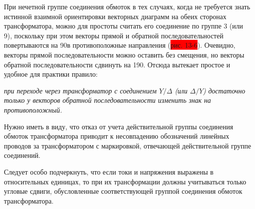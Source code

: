 При нечетной группе соединения обмоток в тех случаях, когда не требуется знать истинной взаимной ориентировки векторных диаграмм на обеих сторонах трансформатора, можно для простоты считать его соединение по группе 3 (или 9), поскольку при этом векторы прямой и обратной последовательностей повертываются на 90\textdegree в противоположные направления (\colorbox{red}{рис. 13-6}). Очевидно, векторы прямой последовательности можно оставить без смещения, но векторы обратной последовательности сдвинуть на 190\textdegree. Отсюда вытекает простое и удобное для практики правило:

\textit{при переходе через трансформатор с соединением $ Y/\Delta $ (или $ \Delta/Y $) достаточно только у векторов обратной последовательности изменить знак на противоположный.}

Нужно иметь в виду, что отказ от учета действительной группы соединения обмоток трансформатора приводит к несовпадению обозначений линейных проводов за трансформатором с маркировкой, отвечающей действительной группе соединений.

Следует особо подчеркнуть, что если токи и напряжения выражены в относительных единицах, то при их трансформации должны учитываться только угловые сдвиги, обусловленные соответствующей группой соединения обмоток трансформатора.